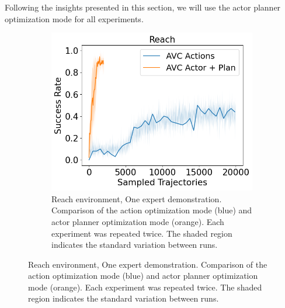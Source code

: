 Following the insights presented in this section, we will use the actor planner optimization mode for all experiments.

\begin{figure}[htbp]
    \centering
    \begin{subfigure}{0.48\textwidth}
      \includegraphics[width=\textwidth]{images/Plan_vs_Actions/Reach.png}
      \caption{Reach environment, One expert demonstration. Comparison of the action optimization mode (blue) and actor planner optimization mode (orange).
      Each experiment was repeated twice. The shaded region indicates the standard variation between runs. }
    \end{subfigure}

    \hfill


\end{figure}
